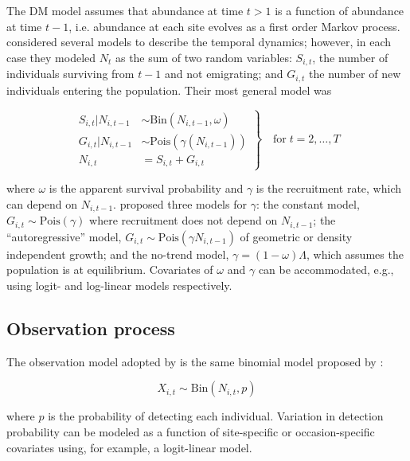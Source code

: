 \documentclass[12pt,english]{article}
\begin{document}
\begin{spacing}{1.9}
\begin{flushleft}
The DM model assumes that abundance at time $t>1$ is a function of
abundance at time $t-1$, i.e. abundance at each site evolves as a
first order Markov process. 
\citet{dail_madsen:2011} considered several models to describe the temporal dynamics;
however, in each case they modeled $N_t$ as the sum of two random variables:
$S_{i,t}$, the number of individuals surviving from $t-1$ and not
emigrating; and $G_{i,t}$ the number of new individuals entering
the population. Their most general model was
\begin{linenomath*}
\begin{equation}
\left.\begin{aligned}
S_{i,t}|N_{i,t-1} &\sim \mathrm{Bin}(N_{i,t-1}, \omega) \\
G_{i,t}|N_{i,t-1} &\sim \mathrm{Pois}(\gamma(N_{i,t-1})) \\
N_{i,t} &= S_{i,t}+G_{i,t}
\end{aligned}\right\} \quad \text{for} \; t=2,\hdots,T
\label{eq:Nt}
\end{equation}
\end{linenomath*}
where $\omega$ is the apparent survival probability and $\gamma$
is the recruitment rate, which can depend on $N_{i,t-1}$.
\citet{dail_madsen:2011} proposed three
models for $\gamma$: the constant model,
$G_{i,t} \sim \mathrm{Pois}(\gamma)$ where recruitment does not
depend on $N_{i,t-1}$; %
the ``autoregressive'' model, $G_{i,t} \sim
\mathrm{Pois}(\gamma N_{i,t-1})$
of geometric or density independent growth; and the
no-trend model, $\gamma = (1-\omega)\Lambda$, which assumes the
population is at equilibrium. Covariates of
$\omega$ and $\gamma$ can be accommodated, e.g., 
using logit- and log-linear models respectively.


\subsection*{Observation process}

The observation model adopted by \citet{dail_madsen:2011} is the same
binomial model proposed by \citet{royle:2004biom}: 
\begin{linenomath*}
\begin{equation}
  X_{i,t} \sim \mathrm{Bin}(N_{i,t}, p)
  \label{eq:p1}
\end{equation}
\end{linenomath*}
where $p$ is the probability of detecting each individual. Variation
in detection probability can be modeled as a function of site-specific
or occasion-specific covariates using, for example, a logit-linear model.


\end{flushleft}
\end{spacing}
\end{document}
